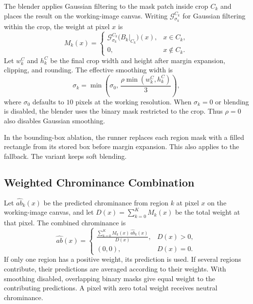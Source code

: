 \documentclass{FastFyp}
\begin{document}
The blender applies Gaussian filtering to the mask patch inside crop
$C_k$ and places the result on the working-image canvas. Writing
$\mathcal{G}^{C_k}_{\sigma_k}$ for Gaussian filtering within the crop,
the weight at pixel $x$ is
\begin{equation}
    M_k(x)=
    \begin{cases}
        \mathcal{G}^{C_k}_{\sigma_k}\bigl(B_k|_{C_k}\bigr)(x), & x\in C_k,\\
        0, & x\notin C_k.
    \end{cases}
\end{equation}
Let $w_k^C$ and $h_k^C$ be the final crop width and height after margin
expansion, clipping, and rounding. The effective smoothing width is
\begin{equation}
    \sigma_k =
    \min\!\left(\sigma_0,\,\frac{\rho\min(w_k^C,h_k^C)}{3}\right),
\end{equation}
where $\sigma_0$ defaults to $10$ pixels at the working resolution. When
$\sigma_k=0$ or blending is disabled, the blender uses the binary mask
restricted to the crop. Thus $\rho=0$ also disables Gaussian smoothing.

In the bounding-box ablation, the runner replaces each region mask with
a filled rectangle from its stored box before margin expansion. This also
applies to the fallback. The variant keeps soft blending.

\subsection{Weighted Chrominance Combination}

Let $\widehat{ab}_k(x)$ be the predicted chrominance from region $k$ at
pixel $x$ on the working-image canvas, and let $D(x)=\sum_{k=0}^{K}M_k(x)$
be the total weight at that pixel. The combined chrominance is
\begin{equation}
    \widehat{ab}(x)=
    \begin{cases}
        \displaystyle\frac{\sum_{k=0}^{K} M_k(x)\,\widehat{ab}_k(x)}{D(x)},
        & D(x)>0,\\[6pt]
        (0,0), & D(x)=0.
    \end{cases}
\end{equation}
If only one region has a positive weight, its prediction is used. If
several regions contribute, their predictions are averaged according to
their weights. With smoothing disabled, overlapping binary masks give
equal weight to the contributing predictions. A pixel with zero total
weight receives neutral chrominance.
\end{document}
